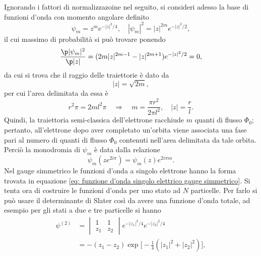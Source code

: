 Ignorando i fattori di normalizzazoine nel seguito, si consideri adesso la base di funzioni d'onda con momento angolare definito 
\begin{equation}
\label{eq: funzione d'onda singolo elettrico gauge simmetrico}
    \psi_m = z^me^{-|z|^2/4},\quad |\psi_m|^2 = |z|^{2m}e^{-|z|^2/2},
\end{equation}
il cui massimo di probabilità si può trovare ponendo
\begin{equation}
    \frac{\p|\psi_m|^2}{\p|z|} = (2m|z|^{2m - 1} - |z|^{2m + 1})e^{-|z|^2/2} = 0,
\end{equation}
da cui si trova che il raggio delle traiettorie è dato da 
\begin{equation}
    |z| = \sqrt{2m},
\end{equation}
per cui l'area delimitata da essa è 
\begin{equation}
    r^2\pi = 2ml^2\pi\quad\Longrightarrow\quad m = \frac{\pi r^2}{2\pi l^2},\quad |z| = \frac{r}{l}.
\end{equation}
Quindi, la traiettoria semi-classica dell'elettrone racchiude $m$ quanti di flusso $\Phi_0$; pertanto, all'elettrone dopo aver completato un'orbita viene associata una fase pari al numero di quanti di flusso $\Phi_0$ contenuti nell'area delimitata da tale orbita. Perciò la monodromia di $\psi_m$ è data dalla relazione
\begin{equation}
    \psi_m(z e^{2i\pi}) = \psi_m(z)e^{2i\pi m}.
\end{equation}
Nel gauge simmetrico le funzioni d'onda a singolo elettrone hanno la forma trovata in equazione \eqref{eq: funzione d'onda singolo elettrico gauge simmetrico}. Si tenta ora di costruire le funzioni d'onda per uno stato ad $N$ particelle. Per farlo si può usare il determinante di Slater così da avere una funzione d'onda totale, ad esempio per gli stati a due e tre particelle si hanno
\begin{equation}
    \begin{split}
        \psi^{(2)} &= 
        \begin{vmatrix}
            1 & 1 \\
            z_1 & z_2
        \end{vmatrix} 
        e^{-|z_1|^2/4}e^{-|z_2|^2/4} \\
        &= -(z_1 - z_2)\exp{\bigg[-\frac{1}{4}(|z_1|^2 + |z_2|^2)\bigg]},
    \end{split}
\end{equation}
